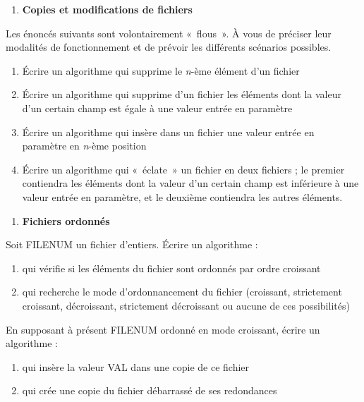 \bigskip

\liststyleExercice
\begin{enumerate}
\item {\sffamily\bfseries
Copies et modifications de fichiers }
\end{enumerate}
{
Les énoncés suivants sont volontairement «~flous~». À vous de préciser
leur modalités de fonctionnement et de prévoir les différents scénarios
possibles.}

\liststyleNumberingv
\begin{enumerate}
\item {
Écrire un algorithme qui supprime le \textit{n}{}-ème élément d’un
fichier}
\item {
Écrire un algorithme qui supprime d’un fichier les éléments dont la
valeur d’un certain champ est égale à une valeur entrée en paramètre }
\item {
Écrire un algorithme qui insère dans un fichier une valeur entrée en
paramètre en \textit{n}{}-ème position}
\item {
Écrire un algorithme qui «~éclate~» un fichier en deux fichiers ; le
premier contiendra les éléments dont la valeur d’un certain champ est
inférieure à une valeur entrée en paramètre, et le deuxième contiendra
les autres éléments.}
\end{enumerate}

\bigskip

\liststyleExercice
\begin{enumerate}
\item {\sffamily\bfseries
Fichiers ordonnés}
\end{enumerate}
{
Soit FILENUM un fichier d’entiers. Écrire un algorithme :}

\liststyleNumberingv
\begin{enumerate}
\item {
qui vérifie si les éléments du fichier sont ordonnés par ordre
croissant}
\item {
qui recherche le mode d’ordonnancement du fichier (croissant,
strictement croissant, décroissant, strictement décroissant ou aucune
de ces possibilités)}
\end{enumerate}
{
En supposant à présent FILENUM ordonné en mode croissant, écrire un
algorithme :}

\liststyleNumberingv
\setcounter{saveenum}{\value{enumi}}
\begin{enumerate}
\setcounter{enumi}{\value{saveenum}}
\item {
qui insère la valeur VAL dans une copie de ce fichier}
\item {
qui crée une copie du fichier débarrassé de ses redondances}
\end{enumerate}

